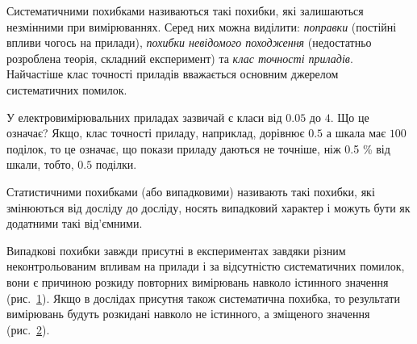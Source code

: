 \documentclass{LabBook}
\begin{document}
Систематичними похибками називаються такі похибки, які залишаються незмінними при вимірюваннях. Серед них можна виділити: \emph{поправки} (постійні впливи чогось на прилади), \emph{похибки невідомого походження} (недостатньо розроблена теорія, складний експеримент) та \emph{клас точності приладів}. Найчастіше клас точності приладів вважається основним джерелом систематичних помилок.

У електровимірювальних приладах зазвичай є класи від $0.05$ до $4$. Що це означає? Якщо, клас точності приладу, наприклад, дорівнює $0.5$ а шкала має $100$ поділок, то це означає, що покази приладу даються не точніше, ніж 0.5 \% від шкали, тобто, $0.5$ поділки.

Статистичними похибками (або випадковими) називають такі похибки, які змінюються від досліду до досліду, носять випадковий характер і можуть бути як додатними такі від'ємними.

Випадкові похибки завжди присутні в експериментах завдяки різним неконтрольованим впливам на прилади і за відсутністю систематичних помилок, вони є причиною розкиду повторних вимірювань навколо істинного значення (рис.~\ref{pic:stat}). Якщо в дослідах присутня також систематична похибка, то результати вимірювань будуть розкидані навколо не істинного, а зміщеного значення (рис.~\ref{pic:system}).

\begin{figure}[h!]\centering

  \begin{subfigure}[b]{0.45\linewidth}\centering
    \caption{}
    \label{pic:stat}
  \end{subfigure}
  \begin{subfigure}[b]{0.45\linewidth}\centering
    \caption{}
    \label{pic:system}
  \end{subfigure}
  \caption{}
  \label{pic:stat+syst_error}
\end{figure}
\end{document}
